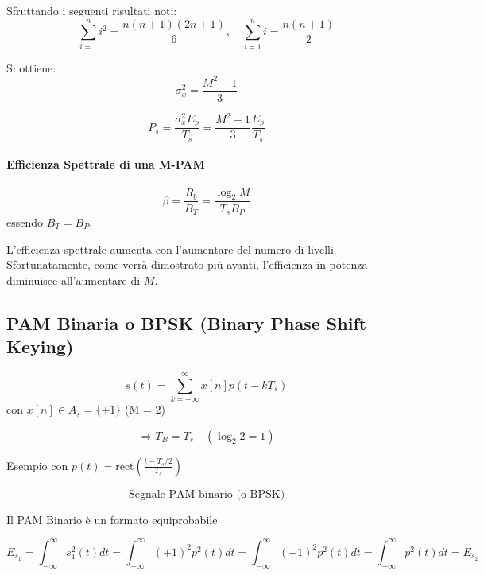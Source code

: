 \documentclass{article}
\begin{document}
Sfruttando i seguenti risultati noti:
\[
\sum_{i=1}^{n} i^2 = \frac{n(n+1)(2n+1)}{6}, \quad \sum_{i=1}^{n} i = \frac{n(n+1)}{2}
\]

Si ottiene:
\[
\sigma_x^2 = \frac{M^2 - 1}{3}
\]

\[
P_s = \frac{\sigma_x^2 E_p}{T_s} = \frac{M^2 - 1}{3} \frac{E_p}{T_s}
\]

\paragraph*{Efficienza Spettrale di una M-PAM}
\[
\beta = \frac{R_b}{B_T} = \frac{\log_2 M}{T_s B_P}
\]
essendo \( B_T = B_P \), 

L'efficienza spettrale aumenta con l'aumentare del numero di livelli. Sfortunatamente, come verrà dimostrato più avanti, l'efficienza in potenza diminuisce all'aumentare di \( M \).

\subsection*{PAM Binaria o BPSK (Binary Phase Shift Keying)}


\[
s(t) = \sum_{k=-\infty}^{\infty} x[n] p(t - kT_s)
\]
con \( x[n] \in A_s = \{\pm 1\} \) (M = 2)

\[
\Rightarrow T_B = T_s \quad (\log_2 2 = 1)
\]

Esempio con \( p(t) = \text{rect}\left(\frac{t-T_s/2}{T_s}\right) \)

\begin{center}
 
\end{center}
\[
\text{Segnale PAM binario (o BPSK)}
\]

Il PAM Binario è un formato equiprobabile

\[
E_{s_1} = \int_{-\infty}^{\infty} s_1^2(t) dt = \int_{-\infty}^{\infty} \left( +1 \right)^2 p^2(t) dt =  \int_{-\infty}^{\infty} \left( -1 \right)^2 p^2(t) dt = \int_{-\infty}^{\infty}  p^2(t) dt  = E_{s_2}
\]
\end{document}
